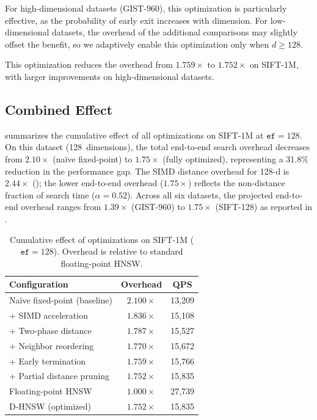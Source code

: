 \documentclass[10pt,journal]{IEEEtran}
\newcommand{\dhnsw}{\textsc{D-HNSW}}
\newcommand{\hnsw}{\textsc{HNSW}}
\begin{document}
For high-dimensional datasets (GIST-960), this optimization is particularly effective, as the probability of early exit increases with dimension. For low-dimensional datasets, the overhead of the additional comparisons may slightly offset the benefit, so we adaptively enable this optimization only when $d \geq 128$.

This optimization reduces the overhead from $1.759\times$ to $1.752\times$ on SIFT-1M, with larger improvements on high-dimensional datasets.

\subsection{Combined Effect}

 summarizes the cumulative effect of all optimizations on SIFT-1M at $\texttt{ef} = 128$. On this dataset (128~dimensions), the total end-to-end search overhead decreases from $2.10\times$ (na\"ive fixed-point) to $1.75\times$ (fully optimized), representing a 31.8\% reduction in the performance gap. The SIMD distance overhead for 128-d is $2.44\times$ (); the lower end-to-end overhead ($1.75\times$) reflects the non-distance fraction of search time ($\alpha{=}0.52$). Across all six datasets, the projected end-to-end overhead ranges from $1.39\times$ (GIST-960) to $1.75\times$ (SIFT-128) as reported in .

\begin{table}[t]
  \centering
  \caption{Cumulative effect of optimizations on SIFT-1M ($\texttt{ef}=128$). Overhead is relative to standard floating-point \hnsw{}.}
  \label{tab:ablation_summary}
  \begin{tabular}{lcc}
    \toprule
    \textbf{Configuration} & \textbf{Overhead} & \textbf{QPS} \\
    \midrule
    Na\"ive fixed-point (baseline) & $2.100\times$ & 13{,}209 \\
    + SIMD acceleration & $1.836\times$ & 15{,}108 \\
    + Two-phase distance & $1.787\times$ & 15{,}527 \\
    + Neighbor reordering & $1.770\times$ & 15{,}672 \\
    + Early termination & $1.759\times$ & 15{,}766 \\
    + Partial distance pruning & $1.752\times$ & 15{,}835 \\
    \midrule
    Floating-point \hnsw{} & $1.000\times$ & 27{,}739 \\
    \dhnsw{} (optimized) & $1.752\times$ & 15{,}835 \\
    \bottomrule
  \end{tabular}
\end{table}
\end{document}
